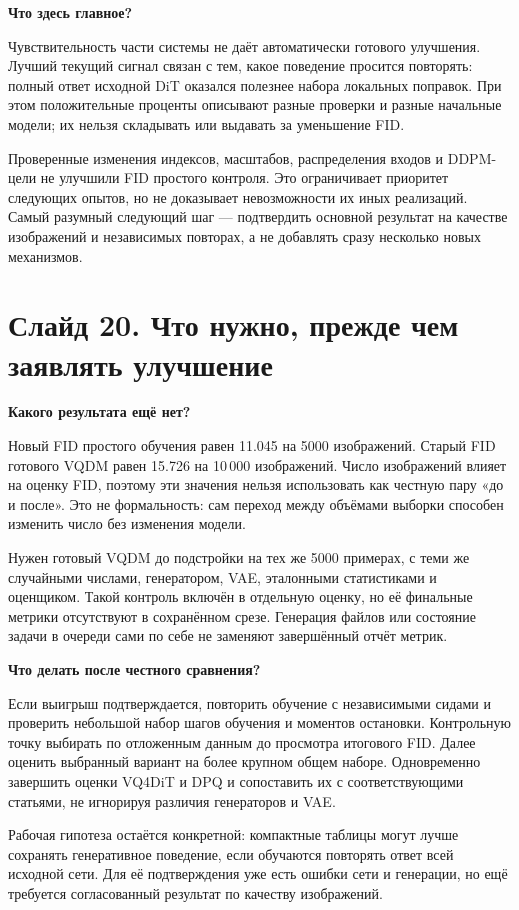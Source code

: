 \documentclass[a4paper,11pt]{article}
\newcommand{\slide}[2]{\clearpage\section*{Слайд #1. #2}}
\newcommand{\question}[1]{\par\textbf{#1}\par}
\begin{document}
\question{Что здесь главное?}
Чувствительность части системы не даёт автоматически готового улучшения.
Лучший текущий сигнал связан с тем, какое поведение просится повторять:
полный ответ исходной DiT оказался полезнее набора локальных поправок.
При этом положительные проценты описывают разные проверки и разные
начальные модели; их нельзя складывать или выдавать за уменьшение FID.

Проверенные изменения индексов, масштабов, распределения входов и DDPM-цели
не улучшили FID простого контроля. Это ограничивает приоритет следующих
опытов, но не доказывает невозможности их иных реализаций.
Самый разумный следующий шаг --- подтвердить основной результат на
качестве изображений и независимых повторах, а не добавлять сразу
несколько новых механизмов.

\slide{20}{Что нужно, прежде чем заявлять улучшение}
\question{Какого результата ещё нет?}
Новый FID простого обучения равен 11.045 на 5000 изображений.
Старый FID готового VQDM равен 15.726 на 10\,000 изображений.
Число изображений влияет на оценку FID, поэтому эти значения нельзя
использовать как честную пару «до и после». Это не формальность:
сам переход между объёмами выборки способен изменить число без изменения модели.

Нужен готовый VQDM до подстройки на тех же 5000 примерах, с теми же
случайными числами, генератором, VAE, эталонными статистиками и оценщиком.
Такой контроль включён в отдельную оценку, но её финальные метрики
отсутствуют в сохранённом срезе. Генерация файлов или состояние задачи
в очереди сами по себе не заменяют завершённый отчёт метрик.

\question{Что делать после честного сравнения?}
Если выигрыш подтверждается, повторить обучение с независимыми сидами
и проверить небольшой набор шагов обучения и моментов остановки.
Контрольную точку выбирать по отложенным данным до просмотра итогового FID.
Далее оценить выбранный вариант на более крупном общем наборе.
Одновременно завершить оценки VQ4DiT и DPQ и сопоставить их с соответствующими
статьями, не игнорируя различия генераторов и VAE.

Рабочая гипотеза остаётся конкретной: компактные таблицы могут лучше
сохранять генеративное поведение, если обучаются повторять ответ всей
исходной сети. Для её подтверждения уже есть ошибки сети и генерации,
но ещё требуется согласованный результат по качеству изображений.
\end{document}

